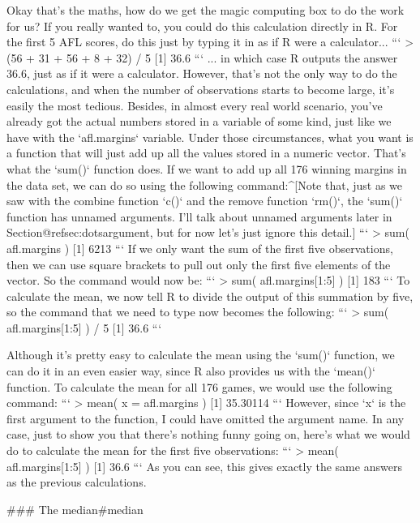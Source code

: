 Okay that's the maths, how do we get the magic computing box to do the work for us? If you really wanted to, you could do this calculation directly in R. For the first 5 AFL scores, do this just by typing it in as if R were a calculator...
```
> (56 + 31 + 56 + 8 + 32) / 5
[1] 36.6
```
... in which case R outputs the answer 36.6, just as if it were a calculator. However, that's not the only way to do the calculations, and when the number of observations starts to become large, it's easily the most tedious. Besides, in almost every real world scenario, you've already got the actual numbers stored in a variable of some kind, just like we have with the `afl.margins` variable. Under those circumstances, what you want is a function that will just add up all the values stored in a numeric vector. That's what the `sum()` function does. If we want to add up all 176 winning margins in the data set, we can do so using the following command:^[Note that, just as we saw with the combine function `c()` and the remove function `rm()`, the `sum()` function has unnamed arguments. I'll talk about unnamed arguments later in Section@refsec:dotsargument, but for now let's just ignore this detail.]
```
> sum( afl.margins )
[1] 6213
```
If we only want the sum of the first five observations, then we can use square brackets to pull out only the first five elements of the vector. So the command would now be: 
```
> sum( afl.margins[1:5] )
[1] 183
```
To calculate the mean, we now tell R to divide the output of this summation by five, so the command that we need to type now becomes the following:
```
> sum( afl.margins[1:5] ) / 5
[1] 36.6
```

Although it's pretty easy to calculate the mean using the `sum()` function, we can do it in an even easier way, since R also provides us with the `mean()` function. To calculate the mean for all 176 games, we would use the following command:
```
> mean( x = afl.margins )
[1] 35.30114
```
However, since `x` is the first argument to the function, I could have omitted the argument name. In any case, just to show you that there's nothing funny going on, here's what we would do to calculate the mean for the first five observations:
```
> mean( afl.margins[1:5] )
[1] 36.6
```
As you can see, this gives exactly the same answers as the previous calculations. 



### The median{#median}

